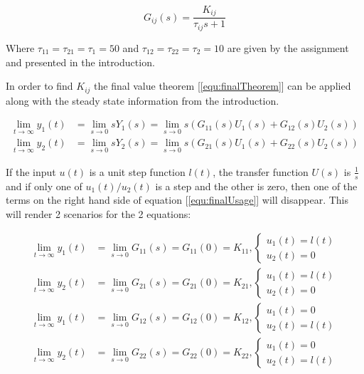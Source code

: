 \documentclass[a4paper, titlepage]{article}
\begin{document}
\begin{equation}
G_{ij}(s) = \frac{K_{ij}}{\tau_{ij} s + 1}
\label{equ:firstorderTransFunc}
\end{equation}

Where $\tau_{11} = \tau_{21} = \tau_1 = 50$ and $\tau_{12} = \tau_{22} = \tau_2 = 10$ are given by the assignment and presented in the introduction.

In order to find $K_{ij}$ the final value theorem [\ref{equ:finalTheorem}] can be applied along with the steady state information from the introduction.

\begin{equation}
\begin{split}
\lim_{t \to \infty} y_{1}(t) &= 
\lim_{s \to 0} sY_{1}(s) = 
\lim_{s \to 0} s(G_{11}(s)U_{1}(s) + G_{12}(s)U_{2}(s)) \\
\lim_{t \to \infty} y_{2}(t) &= 
\lim_{s \to 0} sY_{2}(s) = 
\lim_{s \to 0} s(G_{21}(s)U_{1}(s) + G_{22}(s)U_{2}(s))
\end{split}
\label{equ:finalUsage}
\end{equation}

If the input $u(t)$ is a unit step function $l(t)$, the transfer function $U(s)$ is $\frac{1}{s}$ and if only one of $u_1(t)/u_2(t)$ is a step and the other is zero, then one of the terms on the right hand side of equation [\ref{equ:finalUsage}] will disappear.
This will render 2 scenarios for the 2 equations:

\begin{equation}
\begin{split}
\lim_{t \to \infty} y_{1}(t) &= 
\lim_{s \to 0} G_{11}(s) = G_{11}(0) = K_{11}, 
\begin{cases}
 u_1(t) = l(t) \\ u_2(t) = 0 
\end{cases} \\
\lim_{t \to \infty} y_{2}(t) &= 
\lim_{s \to 0} G_{21}(s) = G_{21}(0) = K_{21}, 
\begin{cases}
 u_1(t) = l(t) \\ u_2(t) = 0 
\end{cases} \\
\lim_{t \to \infty} y_{1}(t) &= 
\lim_{s \to 0} G_{12}(s) = G_{12}(0) = K_{12}, 
\begin{cases}
 u_1(t) = 0 \\ u_2(t) = l(t) 
\end{cases} \\
\lim_{t \to \infty} y_{2}(t) &= 
\lim_{s \to 0} G_{22}(s) = G_{22}(0) = K_{22}, 
\begin{cases}
 u_1(t) = 0 \\ u_2(t) = l(t) 
\end{cases} \\
\end{split}
\end{equation}
\end{document}
